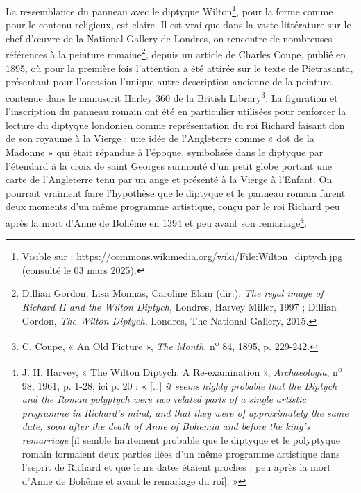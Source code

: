 \documentclass[12pt,twoside,openany]{book}
\begin{document}
La ressemblance du panneau avec le diptyque Wilton\footnote{Visible sur : \href{https://commons.wikimedia.org/wiki/File:Wilton\_diptych.jpg}{https://commons.wikimedia.org/wiki/File:Wilton\_diptych.jpg} (consulté le 03 mars 2025).}, pour la forme comme pour le contenu religieux, est claire. Il est vrai que dans la vaste littérature sur le chef-d’œuvre de la National Gallery de Londres, on rencontre de nombreuses références à la peinture romaine\footnote{Dillian Gordon, Lisa Monnas, Caroline Elam (dir.), \textit{The regal image of Richard II and the Wilton Diptych}, Londres, Harvey Miller, 1997 ; Dillian Gordon, \textit{The Wilton Diptych}, Londres, The National Gallery, 2015.}, depuis un article de Charles Coupe, publié en 1895, où pour la première fois l’attention a été attirée sur le texte de Pietrasanta, présentant pour l’occasion l’unique autre description ancienne de la peinture, contenue dans le manuscrit Harley 360 de la British Library\footnote{C. Coupe, « An Old Picture », \textit{The Month}, n\textsuperscript{o} 84, 1895, p. 229-242.}. La figuration et l’inscription du panneau romain ont été en particulier utilisées pour renforcer la lecture du diptyque londonien comme représentation du roi Richard faisant don de son royaume à la Vierge : une idée de l’Angleterre comme « dot de la Madonne » qui était répandue à l’époque, symbolisée dans le diptyque par l’étendard à la croix de saint Georges surmonté d’un petit globe portant une carte de l’Angleterre tenu par un ange et présenté à la Vierge à l’Enfant. On pourrait vraiment faire l’hypothèse que le diptyque et le panneau romain furent deux moments d’un même programme artistique, conçu par le roi Richard peu après la mort d’Anne de Bohême en 1394 et peu avant son remariage\footnote{J. H. Harvey, « The Wilton Diptych: A Re-examination », \textit{Archaeologia}, n\textsuperscript{o} 98, 1961, p. 1-28, ici p. 20 : « […] \textit{it seems highly probable that the Diptych and the Roman polyptych were two related parts of a single artistic programme in Richard's mind, and that they were of approximately the same date, soon after the death of Anne of Bohemia and before the king's remarriage} [il semble hautement probable que le diptyque et le polyptyque romain formaient deux parties liées d’un même programme artistique dans l’esprit de Richard et que leurs dates étaient proches : peu après la mort d’Anne de Bohême et avant le remariage du roi]. »}.
\end{document}
